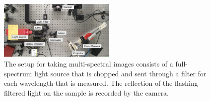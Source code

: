 \begin{figure}[t!]
    \centering
    \includegraphics[width=0.5\textwidth]{resources/images/multi-spectral/experiment_setup.png}
    \caption[Multi-Spectral Material Differentiation Setup]{The setup for taking multi-spectral images consists of a full-spectrum light source that is chopped and sent through a filter for each wavelength that is measured. The reflection of the flashing filtered light on the sample is recorded by the camera.}
    \label{fig:spectral_setup}
\end{figure}
